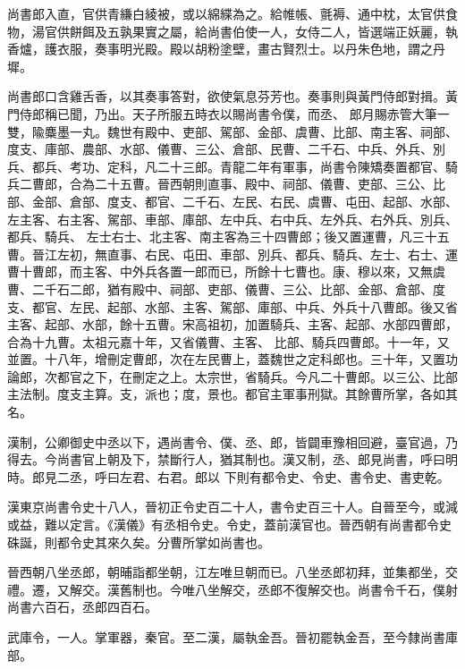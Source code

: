 \begin{pinyinscope}
 尚書郎入直，官供青縑白綾被，或以綿緤為之。給帷帳、氈褥、通中枕，太官供食物，湯官供餅餌及五孰果實之屬，給尚書伯使一人，女侍二人，皆選端正妖麗，執香爐，護衣服，奏事明光殿。殿以胡粉塗壁，畫古賢烈士。以丹朱色地，謂之丹墀。



 尚書郎口含雞舌香，以其奏事答對，欲使氣息芬芳也。奏事則與黃門侍郎對揖。黃門侍郎稱已聞，乃出。天子所服五時衣以賜尚書令僕，而丞、
 郎月賜赤管大筆一雙，隃麋墨一丸。魏世有殿中、吏部、駕部、金部、虞曹、比部、南主客、祠部、度支、庫部、農部、水部、儀曹、三公、倉部、民曹、二千石、中兵、外兵、別兵、都兵、考功、定科，凡二十三郎。青龍二年有軍事，尚書令陳矯奏置都官、騎兵二曹郎，合為二十五曹。晉西朝則直事、殿中、祠部、儀曹、吏部、三公、比部、金部、倉部、度支、都官、二千石、左民、右民、虞曹、屯田、起部、水部、左主客、右主客、駕部、車部、庫部、左中兵、右中兵、左外兵、右外兵、別兵、都兵、騎兵、
 左士右士、北主客、南主客為三十四曹郎；後又置運曹，凡三十五曹。晉江左初，無直事、右民、屯田、車部、別兵、都兵、騎兵、左士、右士、運曹十曹郎，而主客、中外兵各置一郎而已，所餘十七曹也。康、穆以來，又無虞曹、二千石二郎，猶有殿中、祠部、吏部、儀曹、三公、比部、金部、倉部、度支、都官、左民、起部、水部、主客、駕部、庫部、中兵、外兵十八曹郎。後又省主客、起部、水部，餘十五曹。宋高祖初，加置騎兵、主客、起部、水部四曹郎，合為十九曹。太祖元嘉十年，又省儀曹、主客、
 比部、騎兵四曹郎。十一年，又並置。十八年，增刪定曹郎，次在左民曹上，蓋魏世之定科郎也。三十年，又置功論郎，次都官之下，在刪定之上。太宗世，省騎兵。今凡二十曹郎。以三公、比部主法制。度支主算。支，派也；度，景也。都官主軍事刑獄。其餘曹所掌，各如其名。



 漢制，公卿御史中丞以下，遇尚書令、僕、丞、郎，皆闢車豫相回避，臺官過，乃得去。今尚書官上朝及下，禁斷行人，猶其制也。漢又制，丞、郎見尚書，呼曰明時。郎見二丞，呼曰左君、右君。郎以
 下則有都令史、令史、書令史、書吏乾。



 漢東京尚書令史十八人，晉初正令史百二十人，書令史百三十人。自晉至今，或減或益，難以定言。《漢儀》有丞相令史。令史，蓋前漢官也。晉西朝有尚書都令史硃誕，則都令史其來久矣。分曹所掌如尚書也。



 晉西朝八坐丞郎，朝晡詣都坐朝，江左唯旦朝而已。八坐丞郎初拜，並集都坐，交禮。遷，又解交。漢舊制也。今唯八坐解交，丞郎不復解交也。尚書令千石，僕射尚書六百石，丞郎四百石。



 武庫令，一人。掌軍器，秦官。至二漢，屬執金吾。晉初罷執金吾，至今隸尚書庫部。




\end{pinyinscope}
